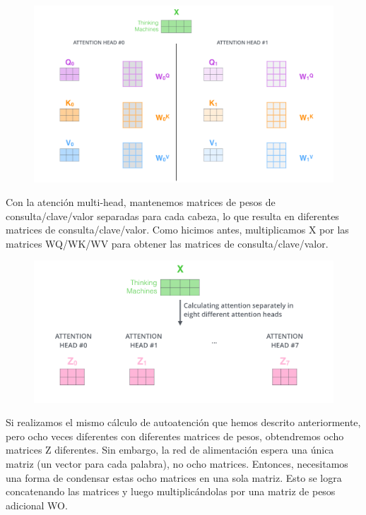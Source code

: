 \begin{figure}[h]
  \centering
  \includegraphics[scale=0.2]{pics/transformer_attention_heads_qkv.png}
\end{figure}

Con la atención multi-head, mantenemos matrices de pesos de consulta/clave/valor separadas para cada cabeza, lo que resulta en diferentes matrices de consulta/clave/valor. Como hicimos antes, multiplicamos X por las matrices WQ/WK/WV para obtener las matrices de consulta/clave/valor.

\begin{figure}[h]
  \centering
  \includegraphics[scale=0.25]{pics/transformer_attention_heads_z.png}
\end{figure}

Si realizamos el mismo cálculo de autoatención que hemos descrito anteriormente, pero ocho veces diferentes con diferentes matrices de pesos, obtendremos ocho matrices Z diferentes. Sin embargo, la red de alimentación espera una única matriz (un vector para cada palabra), no ocho matrices. Entonces, necesitamos una forma de condensar estas ocho matrices en una sola matriz. Esto se logra concatenando las matrices y luego multiplicándolas por una matriz de pesos adicional WO.

